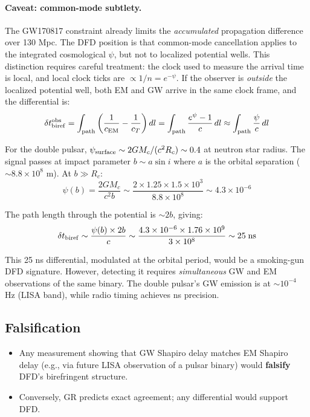 \documentclass[11pt]{article}
\begin{document}
\paragraph{Caveat: common-mode subtlety.} The GW170817 constraint already limits
the \emph{accumulated} propagation difference over 130 Mpc. The DFD position is that
common-mode cancellation applies to the integrated cosmological $\psi$, but not to
localized potential wells. This distinction requires careful treatment: the clock used
to measure the arrival time is local, and local clock ticks are $\propto 1/n = e^{-\psi}$.
If the observer is \emph{outside} the localized potential well, both EM and GW arrive
in the same clock frame, and the differential is:
\begin{equation}
\delta t_{\rm biref}^{\rm obs} = \int_{\rm path}\left(\frac{1}{c_{\rm EM}} - \frac{1}{c_T}\right)dl
= \int_{\rm path}\frac{e^{\psi} - 1}{c}\,dl
\approx \int_{\rm path}\frac{\psi}{c}\,dl
\end{equation}

For the double pulsar, $\psi_{\rm surface} \sim 2GM_c/(c^2 R_c) \sim 0.4$ at neutron
star radius. The signal passes at impact parameter $b \sim a\sin i$ where $a$ is the
orbital separation ($\sim 8.8 \times 10^8$ m). At $b \gg R_c$:
\begin{equation}
\psi(b) = \frac{2GM_c}{c^2 b} \sim \frac{2 \times 1.25 \times 1.5 \times 10^3}{8.8 \times 10^8} \sim 4.3 \times 10^{-6}
\end{equation}

The path length through the potential is $\sim 2b$, giving:
\begin{equation}
\delta t_{\rm biref} \sim \frac{\psi(b) \times 2b}{c} \sim \frac{4.3 \times 10^{-6} \times 1.76 \times 10^9}{3 \times 10^8} \sim 25\;\text{ns}
\end{equation}

This 25 ns differential, modulated at the orbital period, would be a smoking-gun DFD
signature. However, detecting it requires \emph{simultaneous} GW and EM observations
of the same binary. The double pulsar's GW emission is at $\sim 10^{-4}$ Hz (LISA band),
while radio timing achieves ns precision.

\subsection{Falsification}

\begin{itemize}
\item Any measurement showing that GW Shapiro delay matches EM Shapiro delay (e.g.,
via future LISA observation of a pulsar binary) would \textbf{falsify} DFD's
birefringent structure.
\item Conversely, GR predicts exact agreement; any differential would support DFD.
\end{itemize}
\end{document}
